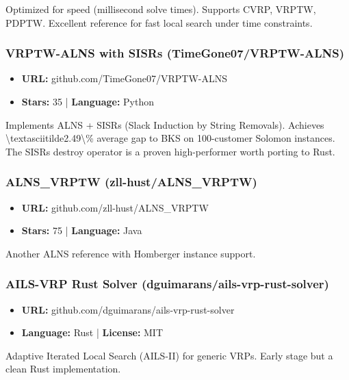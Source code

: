 \documentclass[twocolumn,10pt,letterpaper]{article}
\begin{document}
Optimized for speed (millisecond solve times). Supports CVRP, VRPTW, PDPTW. Excellent reference for fast local search under time constraints.


\subsubsection{VRPTW-ALNS with SISRs (TimeGone07/VRPTW-ALNS)}

\begin{itemize}
\setlength{\itemsep}{0pt}
\setlength{\parskip}{0pt}
  \item \textbf{URL:} github.com/TimeGone07/VRPTW-ALNS
  \item \textbf{Stars:} 35 | \textbf{Language:} Python
\end{itemize}

Implements ALNS + SISRs (Slack Induction by String Removals). Achieves \textbackslash{}textasciitilde2.49\textbackslash{}\% average gap to BKS on 100-customer Solomon instances. The SISRs destroy operator is a proven high-performer worth porting to Rust.


\subsubsection{ALNS\_VRPTW (zll-hust/ALNS\_VRPTW)}

\begin{itemize}
\setlength{\itemsep}{0pt}
\setlength{\parskip}{0pt}
  \item \textbf{URL:} github.com/zll-hust/ALNS\_VRPTW
  \item \textbf{Stars:} 75 | \textbf{Language:} Java
\end{itemize}

Another ALNS reference with Homberger instance support.


\subsubsection{AILS-VRP Rust Solver (dguimarans/ails-vrp-rust-solver)}

\begin{itemize}
\setlength{\itemsep}{0pt}
\setlength{\parskip}{0pt}
  \item \textbf{URL:} github.com/dguimarans/ails-vrp-rust-solver
  \item \textbf{Language:} Rust | \textbf{License:} MIT
\end{itemize}

Adaptive Iterated Local Search (AILS-II) for generic VRPs. Early stage but a clean Rust implementation.
\end{document}
